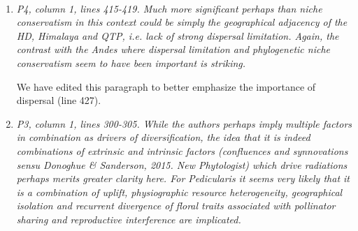 \documentclass[11pt]{letter}
\begin{document}
\begin{letter}{ \\

}
\begin{enumerate}
  We have expanded our discussion of the Cerrado and thank the
  reviewer for these insights.

  \textit{First, the idea of "colonization" with its implication of
    some form of geographical dispersal from adjacent areas, may not
    apply in the case of the Cerrado, where more likely Cerrado
    lineages simply adapted from ancestral forest lineages to tolerate
    fire in situ with the expansion of savanna grasslands associated
    with Pliocene formation of the Cerrado, as suggested by Simon et
    al (2009).}

  Thank you for this correction, this is clearly stated in Simon et
  al. We have replaced ``colonization'' with ``in situ adaptation''
  (line 405).

  \textit{Furthermore, it is also wrong to suggest that there is
    limited in situ diversification of Cerrado lineages. There are
    several well-documented examples of clades in the Cerrado that
    show accelerated rates of in situ species diversification
    generating clades of up to 50 or more species, especially in the
    higher campos rupestres habitats embedded within the Cerrado
    s.l. (see e.g. Mimosa Koenen et al 2013 S Afr J Bot; Calliandra de
    Souza et al 2014 Taxon 62: 1201-1220; Chamaecrista Rando et al
    2016 Int J Plant Sci 177: 3-17).}

  We have revised the section to include this point and references
  (line 407).

\item \textit{P4, column 1, lines 415-419. Much more significant
    perhaps than niche conservatism in this context could be simply
    the geographical adjacency of the HD, Himalaya and QTP, i.e. lack
    of strong dispersal limitation. Again, the contrast with the Andes
    where dispersal limitation and phylogenetic niche conservatism
    seem to have been important is striking.}

  We have edited this paragraph to better emphasize the importance of
  dispersal (line 427).

\item \textit{P3, column 1, lines 300-305. While the authors perhaps
    imply multiple factors in combination as drivers of
    diversification, the idea that it is indeed combinations of
    extrinsic and intrinsic factors (confluences and synnovations
    sensu Donoghue \& Sanderson, 2015. New Phytologist) which drive
    radiations perhaps merits greater clarity here. For Pedicularis it
    seems very likely that it is a combination of uplift,
    physiographic resource heterogeneity, geographical isolation and
    recurrent divergence of floral traits associated with pollinator
    sharing and reproductive interference are implicated.}


\end{enumerate}
\end{letter}
\end{document}
